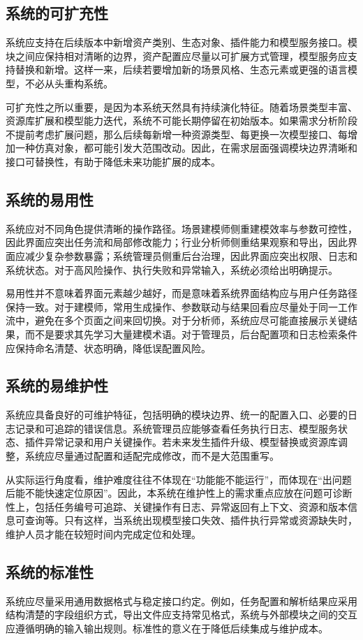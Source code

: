 \documentclass[UTF8,a4paper,10pt]{ctexart}
\begin{document}
\subsection{系统的可扩充性}
系统应支持在后续版本中新增资产类别、生态对象、插件能力和模型服务接口。模块之间应保持相对清晰的边界，资产配置应尽量以可扩展方式管理，模型服务应支持替换和新增。这样一来，后续若要增加新的场景风格、生态元素或更强的语言模型，不必从头重构系统。

可扩充性之所以重要，是因为本系统天然具有持续演化特征。随着场景类型丰富、资源库扩展和模型能力迭代，系统不可能长期停留在初始版本。如果需求分析阶段不提前考虑扩展问题，那么后续每新增一种资源类型、每更换一次模型接口、每增加一种仿真对象，都可能引发大范围改动。因此，在需求层面强调模块边界清晰和接口可替换性，有助于降低未来功能扩展的成本。

\subsection{系统的易用性}
系统应对不同角色提供清晰的操作路径。场景建模师侧重建模效率与参数可控性，因此界面应突出任务流和局部修改能力；行业分析师侧重结果观察和导出，因此界面应减少复杂参数暴露；系统管理员侧重后台治理，因此界面应突出权限、日志和系统状态。对于高风险操作、执行失败和异常输入，系统必须给出明确提示。

易用性并不意味着界面元素越少越好，而是意味着系统界面结构应与用户任务路径保持一致。对于建模师，常用生成操作、参数联动与结果回看应尽量处于同一工作流中，避免在多个页面之间来回切换。对于分析师，系统应尽可能直接展示关键结果，而不是要求其先学习大量建模术语。对于管理员，后台配置项和日志检索条件应保持命名清楚、状态明确，降低误配置风险。

\subsection{系统的易维护性}
系统应具备良好的可维护特征，包括明确的模块边界、统一的配置入口、必要的日志记录和可追踪的错误信息。系统管理员应能够查看任务执行日志、模型服务状态、插件异常记录和用户关键操作。若未来发生插件升级、模型替换或资源库调整，系统应尽量通过配置和适配完成修改，而不是大范围重写。

从实际运行角度看，维护难度往往不体现在“功能能不能运行”，而体现在“出问题后能不能快速定位原因”。因此，本系统在维护性上的需求重点应放在问题可诊断性上，包括任务编号可追踪、关键操作有日志、异常返回有上下文、资源和版本信息可查询等。只有这样，当系统出现模型接口失效、插件执行异常或资源缺失时，维护人员才能在较短时间内完成定位和处理。

\subsection{系统的标准性}
系统应尽量采用通用数据格式与稳定接口约定。例如，任务配置和解析结果应采用结构清楚的字段组织方式，导出文件应支持常见格式，系统与外部模块之间的交互应遵循明确的输入输出规则。标准性的意义在于降低后续集成与维护成本。
\end{document}
